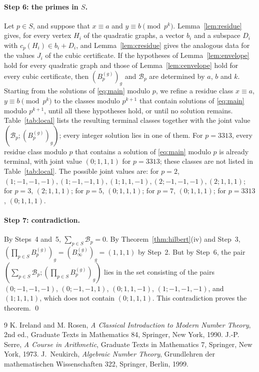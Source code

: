 \documentclass[11pt]{article}
\begin{document}
\paragraph{Step 6: the primes in $S$.} Let $p\in S$, and suppose that $x\equiv a$ and $y\equiv b\pmod{p^k}$. Lemma~\ref{lem:residue} gives, for every vertex $H_i$ of the quadratic graphs, a vector $b_i$ and a subspace $D_i$ with $c_p(H_i)\in b_i+D_i$, and Lemma~\ref{lem:cresidue} gives the analogous data for the values $J_i$ of the cubic certificate. If the hypotheses of Lemma~\ref{lem:envelope} hold for every quadratic graph and those of Lemma~\ref{lem:cenvelope} hold for every cubic certificate, then $(B^{(g)}_p)_g$ and $\mathcal B_p$ are determined by $a$, $b$ and $k$. Starting from the solutions of \eqref{eq:main} modulo $p$, we refine a residue class $x\equiv a$, $y\equiv b\pmod{p^k}$ to the classes modulo $p^{k+1}$ that contain solutions of \eqref{eq:main} modulo $p^{k+1}$, until all these hypotheses hold, or until no solution remains. Table~\ref{tab:local} lists the resulting terminal classes together with the joint value $(\mathcal B_p;(B^{(g)}_p)_g)$; every integer solution lies in one of them. For $p=3313$, every residue class modulo $p$ that contains a solution of \eqref{eq:main} modulo $p$ is already terminal, with joint value $(0;1,1,1)$ for $p=3313$; these classes are not listed in Table~\ref{tab:local}. The possible joint values are: for $p=2$, $(1;-1,-1,-1),\allowbreak (1;-1,-1,1),\allowbreak (1;1,1,-1),\allowbreak (2;-1,-1,-1),\allowbreak (2;1,1,1)$; for $p=3$, $(2;1,1,1)$; for $p=5$, $(0;1,1,1)$; for $p=7$, $(0;1,1,1)$; for $p=3313$, $(0;1,1,1)$.

\paragraph{Step 7: contradiction.} By Steps~4 and~5, $\sum_{p\in S}\mathcal B_p=0$. By Theorem~\ref{thm:hilbert}(iv) and Step~3, $(\prod_{p\in S}B^{(g)}_p)_g=(B^{(g)}_\infty)_g=(1,1,1)$ by Step~2. But by Step~6, the pair $(\textstyle\sum_{p\in S}\mathcal B_p;(\prod_{p\in S}B^{(g)}_p)_g)$ lies in the set consisting of the pairs $(0;-1,-1,-1)$, $(0;-1,-1,1)$, $(0;1,1,-1)$, $(1;-1,-1,-1)$, and $(1;1,1,1)$, which does not contain $(0;1,1,1)$. This contradiction proves the theorem.
\qed

\begin{thebibliography}{9}
 K. Ireland and M. Rosen, \emph{A Classical Introduction to Modern Number Theory}, 2nd ed., Graduate Texts in Mathematics 84, Springer, New York, 1990.
 J.-P. Serre, \emph{A Course in Arithmetic}, Graduate Texts in Mathematics 7, Springer, New York, 1973.
 J.~Neukirch, \emph{Algebraic Number Theory}, Grundlehren der mathematischen Wissenschaften 322, Springer, Berlin, 1999.
\end{thebibliography}
\end{document}
